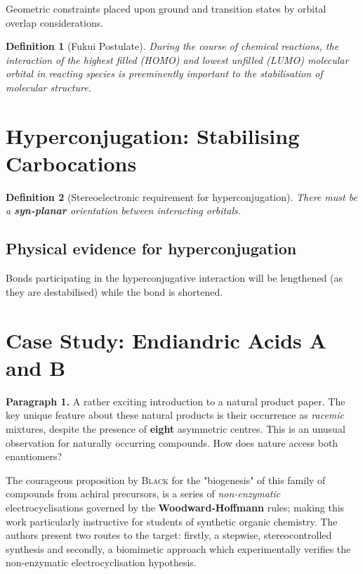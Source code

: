 \documentclass[a4paper]{tufte-handout}
\newtheorem{definition}{Definition}
\begin{document}
Geometric constraints placed upon ground and transition states by orbital overlap considerations.

\begin{definition}[Fukui Postulate]
  During the course of chemical reactions, the interaction of the highest filled (HOMO) and lowest unfilled (LUMO)
  molecular orbital in reacting species is preeminently important to the stabilisation of molecular structure.
\end{definition}

\section{Hyperconjugation: Stabilising Carbocations}

\begin{definition}[Stereoelectronic requirement for hyperconjugation]
There must be a \textbf{syn-planar} orientation between interacting orbitals.  
\end{definition}

\subsection{Physical evidence for hyperconjugation}

Bonds participating in the hyperconjugative interaction  will be lengthened (as they are destabilised) while
the  bond is shortened.

\section*{Case Study: Endiandric Acids A and B}
\textbf{Paragraph 1.} A rather exciting introduction to a natural product paper. The key unique feature about these natural products is their occurrence as \textit{racemic} mixtures, despite the presence of
\textbf{eight} asymmetric centres. This is an unusual observation for naturally occurring compounds. How does nature
access both enantiomers? 

The courageous proposition by {\small \textsc{Black}} for the "biogenesis" of this family of compounds from achiral precursors, 
is a series of \textit{non-enzymatic} electrocyclisations governed by the \textbf{Woodward-Hoffmann} rules; making this work 
particularly instructive for students of synthetic organic chemistry. The authors present two routes to the target: firstly, a stepwise, stereocontrolled synthesis \cite{nicolaou1982endiandricA}
and secondly, a biomimetic approach which experimentally verifies the non-enzymatic electrocyclisation hypothesis.
\end{document}
